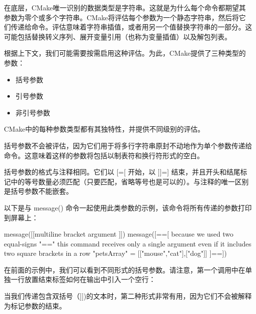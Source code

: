 在底层，CMake唯一识别的数据类型是字符串。这就是为什么每个命令都期望其参数为零个或多个字符串。CMake将评估每个参数为一个静态字符串，然后将它们传递给命令。评估意味着字符串插值，或者用另一个值替换字符串的一部分。这可能包括替换转义序列、展开变量引用（也称为变量插值）以及解包列表。

根据上下文，我们可能需要按需启用这种评估。为此，CMake提供了三种类型的参数：

\begin{itemize}
\item
括号参数

\item
引号参数

\item
非引号参数
\end{itemize}

CMake中的每种参数类型都有其独特性，并提供不同级别的评估。


括号参数不会被评估，因为它们用于将多行字符串原封不动地作为单个参数传递给命令。这意味着这样的参数将包括以制表符和换行符形式的空白。

括号参数的格式与注释相同。它们以 [=[ 开始，以 ]]=] 结束，并且开头和结尾标记中的等号数量必须匹配（只要匹配，省略等号也是可以的）。与注释的唯一区别是括号参数不能嵌套。

以下是与 message() 命令一起使用此类参数的示例，该命令将所有传递的参数打印到屏幕上：


\begin{cmake}
message([[multiline
    bracket
    argument
]])
message([==[
    because we used two equal-signs "=="
    this command receives only a single argument
    even if it includes two square brackets in a row
    { "petsArray" = [["mouse","cat"],["dog"]] }
]==])
\end{cmake}

在前面的示例中，我们可以看到不同形式的括号参数。请注意，第一个调用中在单独一行放置结束标签如何在输出中引入一个空行：


当我们传递包含双括号（]])的文本时，第二种形式非常有用，因为它们不会被解释为标记参数的结束。

